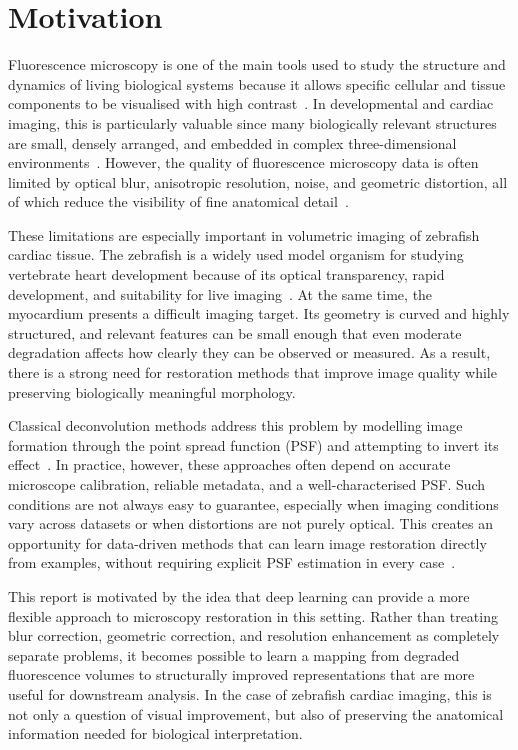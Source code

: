 \section{Motivation}

Fluorescence microscopy is one of the main tools used to study the structure and dynamics of living biological systems because it allows specific cellular and tissue components to be visualised with high contrast~\cite{...}. In developmental and cardiac imaging, this is particularly valuable since many biologically relevant structures are small, densely arranged, and embedded in complex three-dimensional environments~\cite{...}. However, the quality of fluorescence microscopy data is often limited by optical blur, anisotropic resolution, noise, and geometric distortion, all of which reduce the visibility of fine anatomical detail~\cite{...}.

These limitations are especially important in volumetric imaging of zebrafish cardiac tissue. The zebrafish is a widely used model organism for studying vertebrate heart development because of its optical transparency, rapid development, and suitability for live imaging~\cite{...}. At the same time, the myocardium presents a difficult imaging target. Its geometry is curved and highly structured, and relevant features can be small enough that even moderate degradation affects how clearly they can be observed or measured. As a result, there is a strong need for restoration methods that improve image quality while preserving biologically meaningful morphology.

Classical deconvolution methods address this problem by modelling image formation through the point spread function (PSF) and attempting to invert its effect~\cite{...}. In practice, however, these approaches often depend on accurate microscope calibration, reliable metadata, and a well-characterised PSF. Such conditions are not always easy to guarantee, especially when imaging conditions vary across datasets or when distortions are not purely optical. This creates an opportunity for data-driven methods that can learn image restoration directly from examples, without requiring explicit PSF estimation in every case~\cite{...}.

This report is motivated by the idea that deep learning can provide a more flexible approach to microscopy restoration in this setting. Rather than treating blur correction, geometric correction, and resolution enhancement as completely separate problems, it becomes possible to learn a mapping from degraded fluorescence volumes to structurally improved representations that are more useful for downstream analysis. In the case of zebrafish cardiac imaging, this is not only a question of visual improvement, but also of preserving the anatomical information needed for biological interpretation.

